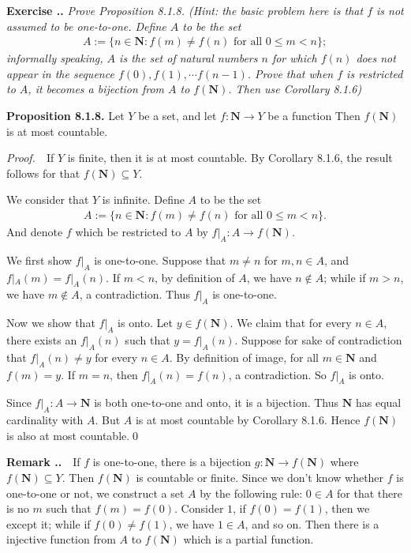 \documentclass{book}
\newcommand{\pff}{\vspace{.25em}\noindent\emph{Proof.}~~}
\newcommand{\remark}{\vspace{.5em}\noindent\textbf{Remark \textbf{\theExercise}}~~}
\newcommand{\titl}[1]{\noindent\textbf{#1}}
\newcounter{Exercise}[section]
\renewcommand{\theExercise}{\thesection.\arabic{Exercise}.}
\newcommand{\new}{\vspace{1.5em}\noindent\textbf{{Exercise \stepcounter{Exercise}\textbf{\theExercise}}} }
\begin{document}
\new\emph{Prove Proposition 8.1.8. (Hint: the basic problem here is that $f$ is not assumed to be one-to-one. Define $A$ to be the set}
    \begin{align*}
        A:=\{n\in\mathbf{N}:f(m)\neq f(n)\text{ for all }0\leq m<n\};
    \end{align*}
\emph{informally speaking, $A$ is the set of natural numbers $n$ for which $f(n)$ does not appear in the sequence $f(0),f(1),\cdots f(n-1)$. Prove that when $f$ is restricted to $A$, it becomes a bijection from $A$ to $f(\mathbf{N})$. Then use Corollary 8.1.6)}

\begin{framed}
\titl{Proposition 8.1.8.} Let $Y$ be a set, and let $f:\mathbf{N}\to Y$ be a function Then $f(\mathbf{N})$ is at most countable.
\end{framed}

\pff If $Y$ is finite, then it is at most countable. By Corollary 8.1.6, the result follows for that $f(\mathbf{N})\subseteq Y$.

We consider that $Y$ is infinite. Define $A$ to be the set
    \begin{align*}
        A:=\{n\in\mathbf{N}:f(m)\neq f(n)\text{ for all }0\leq m<n\}.
    \end{align*}
And denote $f$ which be restricted to $A$ by $f|_{A}:A\to f(\mathbf{N})$.

We first show $f|_{A}$ is one-to-one. Suppose that $m\neq n$ for $m,n\in A$, and $f|_{A}(m)=f|_{A}(n)$. If $m<n$, by definition of $A$, we have $n\notin A$; while if $m>n$, we have $m\notin A$, a contradiction. Thus $f|_{A}$ is one-to-one.

Now we show that $f|_{A}$ is onto. Let $y\in f(\mathbf{N})$. We claim that for every $n\in A$, there exists an $f|_{A}(n)$ such that $y=f|_{A}(n)$. Suppose for sake of contradiction that $f|_{A}(n)\neq y$ for every $n\in A$. By definition of image, for all $m\in\mathbf{N}$ and $f(m)=y$. If $m=n$, then $f|_{A}(n)=f(n)$, a contradiction. So $f|_{A}$ is onto.

Since $f|_{A}:A\to\mathbf{N}$ is both one-to-one and onto, it is a bijection. Thus $\mathbf{N}$ has equal cardinality with $A$. But $A$ is at most countable by Corollary 8.1.6. Hence $f(\mathbf{N})$ is also at most countable.\qed

\remark If $f$ is one-to-one, there is a bijection $g:\mathbf{N}\to f(\mathbf{N})$ where $f(\mathbf{N})\subseteq Y$. Then $f(\mathbf{N})$ is countable or finite. Since we don't know whether $f$ is one-to-one or not, we construct a set $A$ by the following rule: $0\in A$ for that there is no $m$ such that $f(m)=f(0)$. Consider $1$, if $f(0)=f(1)$, then we except it; while if $f(0)\neq f(1)$, we have $1\in A$, and so on. Then there is a injective function from $A$ to $f(\mathbf{N})$ which is a partial function.
\end{document}
